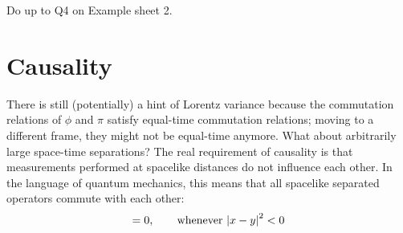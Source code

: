 \begin{exercise}
  Do up to Q4 on Example sheet 2.
\end{exercise}

\section{Causality}%
\label{sec:causality}

There is still (potentially) a hint of Lorentz variance because the commutation relations of $\phi$ and $\pi$ satisfy equal-time commutation relations; moving to a different frame, they might not be equal-time anymore.
What about arbitrarily large space-time separations?
The real requirement of causality is that measurements performed at spacelike distances do not influence each other. In the language of quantum mechanics, this means that all spacelike separated operators commute with each other:
\begin{equation}
  [O_1(x), O_2(y)] = 0, \qquad \text{whenever } \abs{x-y}^2 < 0
\end{equation}

